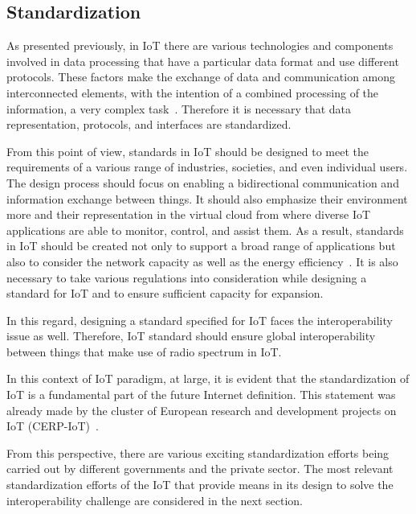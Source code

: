 \subsection{Standardization}
As presented previously, in IoT there are various technologies and components involved in data processing that have a particular data format and use different protocols. These factors make the exchange of data and communication among interconnected elements, with the intention of a combined processing of the information, a very complex task~\cite{booksd}. Therefore it is necessary that data representation, protocols, and interfaces are standardized. \par 
From this point of view, standards in IoT should be designed to meet the requirements of a various range of industries, societies, and even individual users. The design process should focus on enabling a bidirectional communication and information exchange between things. It should also emphasize their environment more and their representation in the virtual cloud from where diverse IoT applications are able to monitor, control, and assist them. As a result, standards in IoT should be created not only to support a broad range of applications but also to consider the network capacity as well as the energy efficiency~\cite{hindi}.  It is also necessary to take various regulations into consideration while designing a standard for IoT and to ensure sufficient capacity for expansion. \par
In this regard, designing a standard specified for IoT faces the interoperability issue as well. Therefore, IoT standard should ensure global interoperability between things that make use of radio spectrum in IoT. \par
In this context of IoT paradigm, at large, it is evident that the standardization of IoT is a fundamental part of the future Internet definition. This statement was already made by the cluster of European research and development projects on IoT (CERP-IoT)~\cite{fromhindi}.\par
From this perspective, there are various exciting standardization efforts being carried out by different governments and the private sector. The most relevant standardization efforts of the IoT that provide means in its design to solve the interoperability challenge are considered in the next section.


